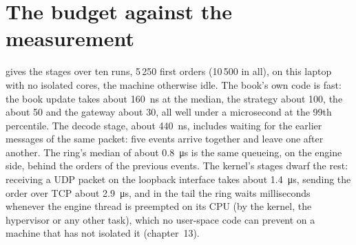\label{lst:ll:build-tick-to-trade-measured:loop}

\section{The budget against the measurement}

 gives the stages over ten runs, 5\,250 first orders (10\,500 in all), on this
laptop with no isolated cores, the machine otherwise idle. The book's own code is fast: the book update takes about
\qty{160}{\nano\second} at the median, the strategy about 100, the  about 50 and the gateway about 30, all well under a
microsecond at the 99th percentile. The decode stage, about \qty{440}{\nano\second}, includes waiting for the earlier messages
of the same packet: five events arrive together and leave one after another. The ring's median of about \qty{0.8}{\micro\second} is the
same queueing, on the engine side, behind the orders of the previous events. The kernel's stages dwarf the rest: receiving a
UDP packet on the loopback interface takes about \qty{1.4}{\micro\second}, sending the order over TCP about \qty{2.9}{\micro\second},
and in the tail the ring waits milliseconds whenever the engine thread is preempted on its CPU (by the kernel, the hypervisor
or any other task),
which no user-space code can prevent on a machine that has not isolated it (chapter~13).

